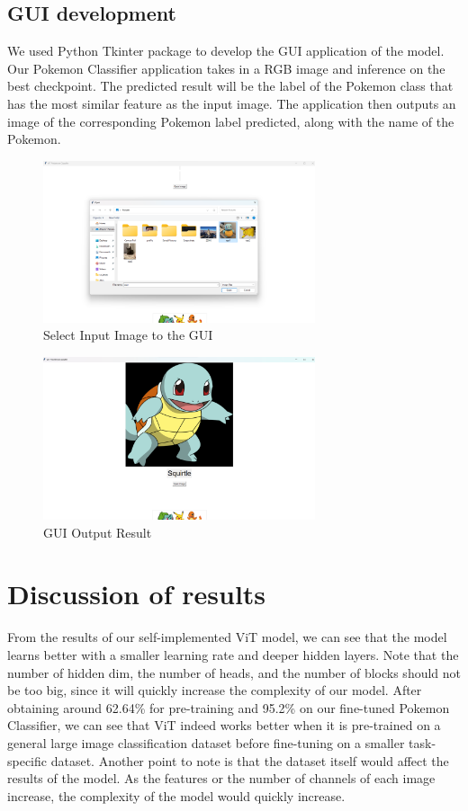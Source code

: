 \documentclass{article} %
\begin{document}
\subsection{GUI development}
We used Python Tkinter package to develop the GUI application of the model.
Our Pokemon Classifier application takes in a RGB image and inference on the best checkpoint.
The predicted result will be the label of the Pokemon class that has the most similar feature 
as the input image.
The application then outputs an image of the corresponding Pokemon label predicted,
along with the name of the Pokemon.
\begin{figure}[h]
\begin{center}
\includegraphics[width=8cm]{gui_process.png}
\end{center}
\caption{Select Input Image to the GUI}
\end{figure}
\begin{figure}[h]
\begin{center}
\includegraphics[width=8cm]{gui_result.png}
\end{center}
\caption{GUI Output Result}
\end{figure}


\section{Discussion of results}
From the results of our self-implemented ViT model, we can see that the model learns better with
a smaller learning rate and deeper hidden layers. Note that the number of hidden dim, the number 
of heads, and the number of blocks should not be too big, since it will quickly increase the complexity
of our model.
After obtaining around 62.64\% for pre-training and 95.2\% on our fine-tuned Pokemon Classifier, 
we can see that ViT indeed works better when it is pre-trained on a general large image classification dataset
before fine-tuning on a smaller task-specific dataset.
Another point to note is that the dataset itself would affect the results of the model. As the 
features or the number of channels of each image increase, the complexity of the model would quickly increase.  
\end{document}
